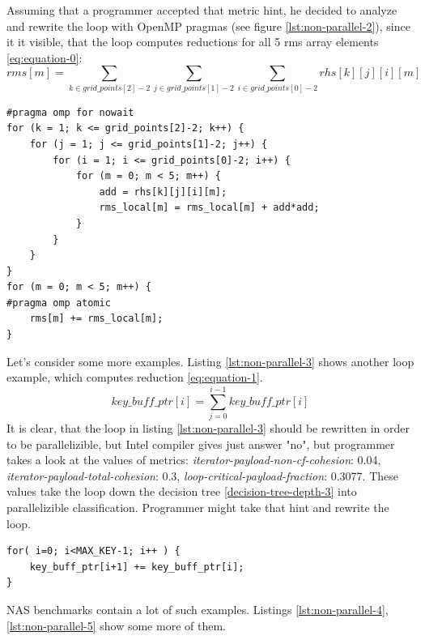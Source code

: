 \null\qquad Assuming that a programmer accepted that metric hint, he decided to analyze and rewrite the loop with OpenMP pragmas (see figure \ref{lst:non-parallel-2}), since it it visible, that the loop computes reductions for all 5 rms array elements \ref{eq:equation-0}:\newline
\begin{equation}
rms\left[ m \right] = \sum\limits_{k \in grid\_points\left[ 2\right] -2}\sum\limits_{j \in grid\_points\left[ 1\right] -2}\sum\limits_{i \in grid\_points\left[ 0\right] -2} rhs\left[ k\right] \left[ j\right] \left[ i\right] \left[ m\right]
\label{eq:equation-0}
\end{equation}
\begin{lstlisting}[caption={Loop, which has not been parallelized by Intel C/C++ compiler, but does seem algorithmically parallelizible, given absense of cross-iteration dependencies introduced by the function call. }, captionpos=b, label=lst:non-parallel-2, float,floatplacement=H]
#pragma omp for nowait
for (k = 1; k <= grid_points[2]-2; k++) {
	for (j = 1; j <= grid_points[1]-2; j++) {
		for (i = 1; i <= grid_points[0]-2; i++) {
			for (m = 0; m < 5; m++) {
				add = rhs[k][j][i][m];
				rms_local[m] = rms_local[m] + add*add;
			} 
		} 
	} 
} 
for (m = 0; m < 5; m++) {
#pragma omp atomic
	rms[m] += rms_local[m];
}
\end{lstlisting}
\null\qquad Let's consider some more examples. Listing \ref{lst:non-parallel-3} shows another loop example, which computes reduction \ref{eq:equation-1}.
\begin{equation}
key\_buff\_ptr\left[ i \right] = \sum\limits_{j=0}^{i-1} key\_buff\_ptr\left[ i\right]
\label{eq:equation-1}
\end{equation}
\null\qquad It is clear, that the loop in listing \ref{lst:non-parallel-3} should be rewritten in order to be parallelizible, but Intel compiler gives just answer "no", but programmer takes a look at the values of metrics: \textit{iterator-payload-non-cf-cohesion}: 0.04, \textit{iterator-payload-total-cohesion}: 0.3, \textit{loop-critical-payload-fraction}: 0.3077. These values take the loop down the decision tree \ref{decision-tree-depth-3} into parallelizible classification. Programmer might take that hint and rewrite the loop.\newline
\begin{lstlisting}[caption={\textit{SNU\_NAS/IS/is.c:508}. Algorithmically parallelizible problem ends up hidden from compiler behind unsuccessful implementation.}, captionpos=b, label=lst:non-parallel-3, float, floatplacement=H, mathescape=true]
for( i=0; i<MAX_KEY-1; i++ ) {
	key_buff_ptr[i+1] += key_buff_ptr[i];
}
\end{lstlisting}
\null\qquad NAS benchmarks contain a lot of such examples. Listings \ref{lst:non-parallel-4}, \ref{lst:non-parallel-5} show some more of them.


